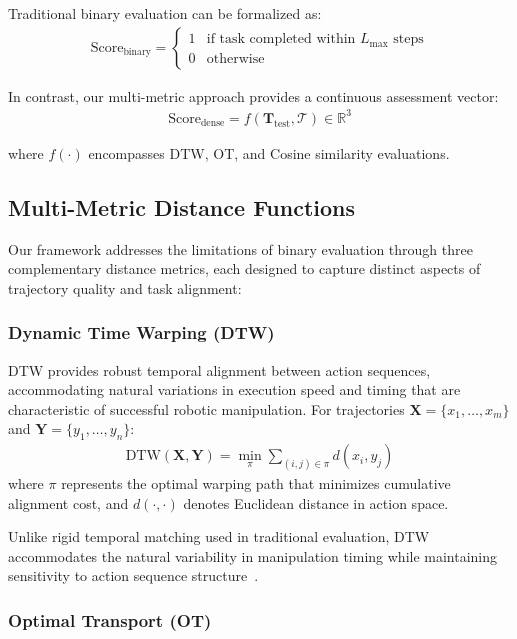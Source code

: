 \documentclass[10pt,twocolumn]{article}
\begin{document}
Traditional binary evaluation can be formalized as:
\begin{align}
\text{Score}_{\text{binary}} = \begin{cases}
1 & \text{if task completed within } L_{\max} \text{ steps} \\
0 & \text{otherwise}
\end{cases}
\end{align}

In contrast, our multi-metric approach provides a continuous assessment vector:
\begin{align}
\text{Score}_{\text{dense}} = f(\mathbf{T}_{\text{test}}, \mathcal{T}) \in \mathbb{R}^3
\end{align}

where $f(\cdot)$ encompasses DTW, OT, and Cosine similarity evaluations.

\subsection{Multi-Metric Distance Functions}

Our framework addresses the limitations of binary evaluation through three complementary distance metrics, each designed to capture distinct aspects of trajectory quality and task alignment:

\subsubsection{Dynamic Time Warping (DTW)}

DTW provides robust temporal alignment between action sequences, accommodating natural variations in execution speed and timing that are characteristic of successful robotic manipulation. For trajectories $\mathbf{X} = \{x_1, \ldots, x_m\}$ and $\mathbf{Y} = \{y_1, \ldots, y_n\}$:
\begin{align}
\text{DTW}(\mathbf{X}, \mathbf{Y}) = \min_{\pi} \sum_{(i,j) \in \pi} d(x_i, y_j)
\end{align}
where $\pi$ represents the optimal warping path that minimizes cumulative alignment cost, and $d(\cdot, \cdot)$ denotes Euclidean distance in action space.

Unlike rigid temporal matching used in traditional evaluation, DTW accommodates the natural variability in manipulation timing while maintaining sensitivity to action sequence structure~\cite{sakoe1978dynamic, pervez2017learning}.

\subsubsection{Optimal Transport (OT)}
\end{document}
